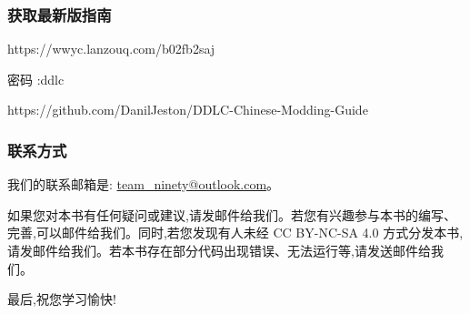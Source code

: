 \subsubsection*{获取最新版指南}
https://wwyc.lanzouq.com/b02fb2saj

密码 :ddlc

https://github.com/DanilJeston/DDLC-Chinese-Modding-Guide

\subsubsection*{联系方式}
我们的联系邮箱是: \url{team_ninety@outlook.com}。
\newline\newline\par
如果您对本书有任何疑问或建议,请发邮件给我们。若您有兴趣参与本书的编写、完善,可以邮件给我们。同时,若您发现有人未经 CC BY-NC-SA 4.0 方式分发本书,请发邮件给我们。若本书存在部分代码出现错误、无法运行等,请发送邮件给我们。

最后,祝您学习愉快!